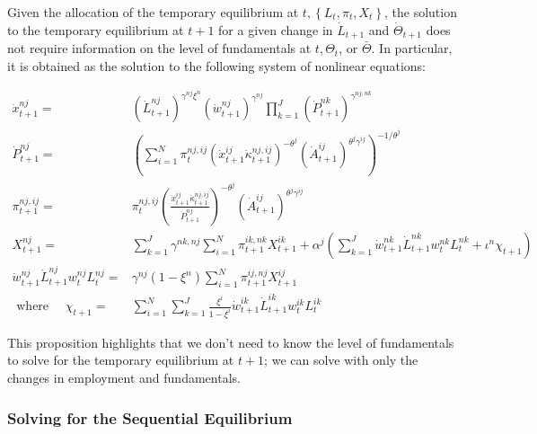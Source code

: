 \documentclass[10pt]{article}
\begin{document}
\begin{proposition} 
    Given the allocation of the temporary equilibrium at 
    $t,\left\{L_t, \pi_t, X_t\right\}$, the solution to the temporary 
    equilibrium at $t+1$ for a given change in $\dot{L}_{t+1}$ and 
    $\dot{\Theta}_{t+1}$ does not require information on the level 
    of fundamentals at $t, \Theta_t$, or $\bar{\Theta}$. In particular, 
    it is obtained as the solution to the following system 
    of nonlinear equations: 

    \begin{align}
        \dot{x}_{t+1}^{n j}=&\left(\dot{L}_{t+1}^{n j}\right)^{\gamma^{n j} \xi^n}\left(\dot{w}_{t+1}^{n j}\right)^{\gamma^{n j}} \prod_{k=1}^J\left(\dot{P}_{t+1}^{n k}\right)^{\gamma^{n j, n k}} \\
        \dot{P}_{t+1}^{n j}=&\left(\sum_{i=1}^N \pi_t^{n j, i j}\left(\dot{x}_{t+1}^{i j} \dot{\kappa}_{t+1}^{n j, i j}\right)^{-\theta^j}\left(\dot{A}_{t+1}^{i j}\right)^{\theta^j \gamma^{i j}}\right)^{-1 / \theta^j} \\
        \pi_{t+1}^{n j, i j}=&\pi_t^{n j, i j}\left(\frac{\dot{x}_{t+1}^{i j} \dot{\kappa}_{t+1}^{n j, i j}}{\dot{P}_{t+1}^{n j}}\right)^{-\theta^j}\left(\dot{A}_{t+1}^{i j}\right)^{\theta^j \gamma^{i j}} \\
        X_{t+1}^{n j}=&\sum_{k=1}^J \gamma^{n k, n j} \sum_{i=1}^N \pi_{t+1}^{i k, n k} X_{t+1}^{i k}+\alpha^j\left(\sum_{k=1}^J \dot{w}_{t+1}^{n k} \dot{L}_{t+1}^{n k} w_t^{n k} L_t^{n k}+\iota^n \chi_{t+1}\right) \\
        \dot{w}_{t+1}^{n j} \dot{L}_{t+1}^{n j} w_t^{n j} L_t^{n j}=&\gamma^{n j}\left(1-\xi^n\right) \sum_{i=1}^N \pi_{t+1}^{i j, n j} X_{t+1}^{i j} \\
        \text { where } \quad \chi_{t+1}=&\sum_{i=1}^N \sum_{k=1}^J \frac{\xi^i}{1-\xi^i} \dot{w}_{t+1}^{i k} \dot{L}_{t+1}^{i k} w_t^{i k} L_t^{i k}
    \end{align}

\end{proposition}

This proposition highlights that 
we don't need to know the level of fundamentals
to solve for the temporary equilibrium at $t+1$; we can solve 
with only the changes in employment and fundamentals.

\subsubsection{Solving for the Sequential Equilibrium}
\end{document}
